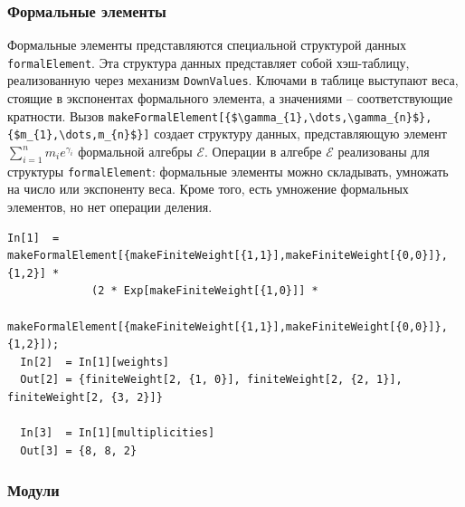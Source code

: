 \subsubsection{Формальные элементы}
\label{sec:formal-elements}

Формальные элементы представляются специальной структурой данных \lstinline{formalElement}. Эта структура данных представляет собой хэш-таблицу, реализованную через механизм \lstinline{DownValues}. Ключами в таблице выступают веса, стоящие в экспонентах формального элемента, а значениями -- соответствующие кратности.  Вызов \lstinline[mathescape=true]!makeFormalElement[{$\gamma_{1},\dots,\gamma_{n}$},{$m_{1},\dots,m_{n}$}]! создает структуру данных, представляющую элемент $\sum_{i=1}^{n} m_{i} e^{\gamma_{i}}$ формальной алгебры $\mathcal{E}$. Операции в алгебре  $\mathcal{E}$ реализованы для структуры \lstinline{formalElement}: формальные элементы можно складывать, умножать на число или экспоненту веса. Кроме того, есть умножение формальных элементов, но нет операции деления.
\begin{lstlisting}[mathescape=true]
  In[1]  = makeFormalElement[{makeFiniteWeight[{1,1}],makeFiniteWeight[{0,0}]},{1,2}] *
             (2 * Exp[makeFiniteWeight[{1,0}]] *
             makeFormalElement[{makeFiniteWeight[{1,1}],makeFiniteWeight[{0,0}]},{1,2}]);
  In[2]  = In[1][weights]
  Out[2] = {finiteWeight[2, {1, 0}], finiteWeight[2, {2, 1}], finiteWeight[2, {3, 2}]}

  In[3]  = In[1][multiplicities]
  Out[3] = {8, 8, 2}
\end{lstlisting}

\subsubsection{Модули}
\label{sec:modules}

